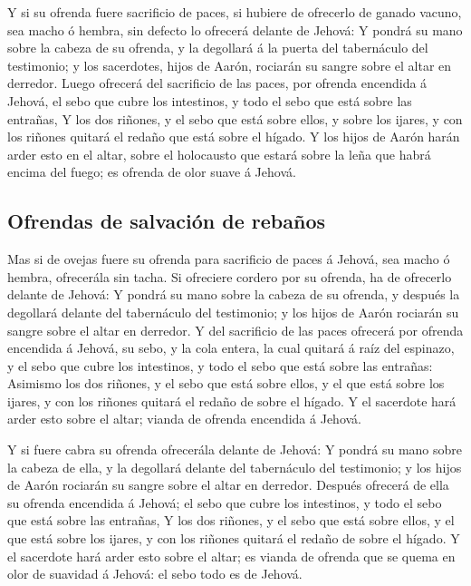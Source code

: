  Y si su ofrenda fuere sacrificio de paces, si hubiere de
ofrecerlo de ganado vacuno, sea macho ó hembra, sin defecto lo ofrecerá
delante de Jehová:  Y pondrá su mano sobre la cabeza de su
ofrenda, y la degollará á la puerta del tabernáculo del testimonio; y
los sacerdotes, hijos de Aarón, rociarán su sangre sobre el altar en
derredor.  Luego ofrecerá del sacrificio de las paces, por
ofrenda encendida á Jehová, el sebo que cubre los intestinos, y todo el
sebo que está sobre las entrañas,  Y los dos riñones, y el
sebo que está sobre ellos, y sobre los ijares, y con los riñones quitará
el redaño que está sobre el hígado.  Y los hijos de Aarón
harán arder esto en el altar, sobre el holocausto que estará sobre la
leña que habrá encima del fuego; es ofrenda de olor suave á Jehová.

\hypertarget{ofrendas-de-salvaciuxf3n-de-rebauxf1os}{%
\subsection{Ofrendas de salvación de
rebaños}\label{ofrendas-de-salvaciuxf3n-de-rebauxf1os}}

 Mas si de ovejas fuere su ofrenda para sacrificio de paces
á Jehová, sea macho ó hembra, ofrecerála sin tacha.  Si
ofreciere cordero por su ofrenda, ha de ofrecerlo delante de Jehová:
 Y pondrá su mano sobre la cabeza de su ofrenda, y después
la degollará delante del tabernáculo del testimonio; y los hijos de
Aarón rociarán su sangre sobre el altar en derredor.  Y del
sacrificio de las paces ofrecerá por ofrenda encendida á Jehová, su
sebo, y la cola entera, la cual quitará á raíz del espinazo, y el sebo
que cubre los intestinos, y todo el sebo que está sobre las entrañas:
 Asimismo los dos riñones, y el sebo que está sobre ellos,
y el que está sobre los ijares, y con los riñones quitará el redaño de
sobre el hígado.  Y el sacerdote hará arder esto sobre el
altar; vianda de ofrenda encendida á Jehová.

 Y si fuere cabra su ofrenda ofrecerála delante de Jehová:
 Y pondrá su mano sobre la cabeza de ella, y la degollará
delante del tabernáculo del testimonio; y los hijos de Aarón rociarán su
sangre sobre el altar en derredor.  Después ofrecerá de
ella su ofrenda encendida á Jehová; el sebo que cubre los intestinos, y
todo el sebo que está sobre las entrañas,  Y los dos
riñones, y el sebo que está sobre ellos, y el que está sobre los ijares,
y con los riñones quitará el redaño de sobre el hígado.  Y
el sacerdote hará arder esto sobre el altar; es vianda de ofrenda que se
quema en olor de suavidad á Jehová: el sebo todo es de Jehová.

